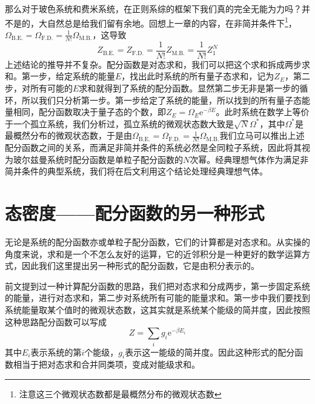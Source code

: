 \documentclass[../../main.tex]{subfiles}
\begin{document}
那么对于玻色系统和费米系统，在正则系综的框架下我们真的完全无能为力吗？并不是的，大自然总是给我们留有余地。回想上一章的内容，在非简并条件下\footnote{注意这三个微观状态数都是最概然分布的微观状态数}，\(\Omega_{\text{B.E.}}=\Omega_{\text{F.D.}}=\frac{1}{N!}\Omega_{\text{M.B.}}\)，这导致
\begin{equation}
    Z_{\text{B.E.}}=Z_{\text{F.D.}}=\frac{1}{N!}Z_{\text{M.B.}}=\frac{1}{N!}Z_1^N
\end{equation}
上述结论的推导并不复杂。配分函数是对态求和，我们可以把这个求和拆成两步求和。第一步，给定系统的能量\(E\)，找出此时系统的所有量子态求和，记为\(Z_E\)，第二步，对所有可能的\(E\)求和就得到了系统的配分函数。显然第二步无非是第一步的循环，所以我们只分析第一步。第一步给定了系统的能量，所以找到的所有量子态能量相同，配分函数取决于量子态的个数，即\(Z_E=\Omega_E\mathrm{e}^{-\beta E}\)。此时系统在数学上等价于一个孤立系统，我们分析过，孤立系统的微观状态数大致是\(\sqrt{N}\Omega^*\)，其中\(\Omega^*\)是最概然分布的微观状态数，于是由\(\Omega_{\text{B.E.}}=\Omega_{\text{F.D.}}=\frac{1}{N!}\Omega_{\text{M.B.}}\)我们立马可以推出上述配分函数之间的关系，而满足非简并条件的系统必然是全同粒子系统，因此将其视为玻尔兹曼系统时配分函数是单粒子配分函数的\(N\)次幂。经典理想气体作为满足非简并条件的典型系统，我们将在后文利用这个结论处理经典理想气体。
\section{态密度——配分函数的另一种形式}

无论是系统的配分函数亦或单粒子配分函数，它们的计算都是对态求和。从实操的角度来说，求和是一个不怎么友好的运算，它的近邻积分是一种更好的数学运算方式，因此我们这里提出另一种形式的配分函数，它是由积分表示的。

前文提到过一种计算配分函数的思路，我们把对态求和分成两步，第一步固定系统的能量，进行对态求和，第二步对系统所有可能的能量求和。第一步中我们要找到系统能量取某个值时的微观状态数，这其实就是系统某个能级的简并度，因此按照这种思路配分函数可以写成
\begin{equation}\label{eq:求和配分函数}
    Z=\sum_i g_i\mathrm{e}^{-\beta E_i}
\end{equation}
其中\(E_i\)表示系统的第\(i\)个能级，\(g_i\)表示这一能级的简并度。因此这种形式的配分函数相当于把对态求和合并同类项，变成对能级求和。
\end{document}
